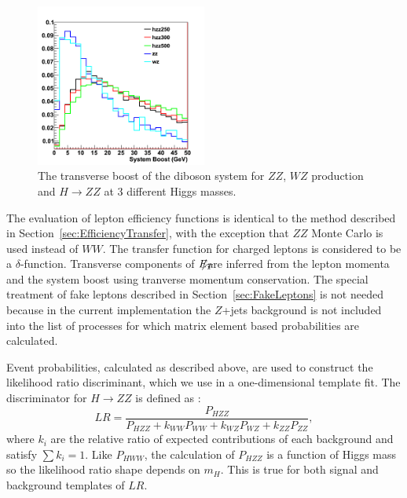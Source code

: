 \documentclass{cmspaper}
\newcommand{\met}{\mbox{$E_T\hspace{-1.1em}/$\hspace{0.7em}}}
\begin{document}
\begin{figure}[!htbp]                                                                                         
\begin{center}                                                                                                
\includegraphics[width=0.5\textwidth]{figures/hzz_boost_allj.png}                                                      
\caption{The transverse boost of the diboson system for $ZZ$, $WZ$ production and $H \rightarrow ZZ$ at 3 different Higgs masses.} 
\label{fig:zzboost}                                                                                           
\end{center}                                                                                                  
\end{figure}  
 
The evaluation of lepton efficiency functions is identical to the method described in Section~\ref{sec:EfficiencyTransfer}, with the 
exception that $ZZ$ Monte Carlo is used instead of $WW$. The transfer function for charged leptons is considered to be a $\delta$-function.
Transverse components of \met are inferred from the lepton momenta and the system boost using tranverse momentum conservation.
The special treatment of fake leptons described in Section~\ref{sec:FakeLeptons} is not needed because in the current implementation
the $Z$+jets background is not included into the list of processes for which matrix element based probabilities are calculated. 

Event probabilities, calculated as described above, are used to construct the likelihood ratio discriminant, 
which we use in a one-dimensional template fit.  The discriminator for $H\rightarrow ZZ$ is defined as :
\begin{equation}
\label{eqn:LRHZZ}
LR = \frac { P_{HZZ}} { P_{HZZ} + k_{WW} P_{WW}+ k_{WZ} P_{WZ} + k_{ZZ} P_{ZZ}},
\end{equation}
where $k_{i}$ are the relative ratio of expected contributions of each background and satisfy $\sum k_{i} =1$.
Like $P_{HWW}$, the calculation of $P_{HZZ}$ is a function of Higgs mass so the likelihood ratio shape depends on $m_H$. 
This is true for both signal and background templates of $LR$.
\end{document}
